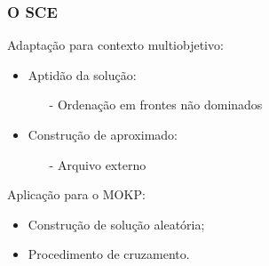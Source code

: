\documentclass[10pt,xcolor=table,fleqn]{beamer}
\begin{document}
\begin{frame}
	\frametitle{O SCE}
  \begin{block}{Adaptação para contexto multiobjetivo:}
    \begin{itemize}
      \item{ Aptidão da solução:
        \begin{itemize}
          \item[-] Ordenação em frontes não dominados
        \end{itemize}
      }
      \item{ Construção de \paretoset{} aproximado:
        \begin{itemize}
          \item[-] Arquivo externo
        \end{itemize}
      }
    \end{itemize}
  \end{block}
  \pause
  \begin{block}{Aplicação para o MOKP:}
    \begin{itemize}
      \item{ Construção de solução aleatória;}
      \item{ Procedimento de cruzamento.}
    \end{itemize}
  \end{block}
\end{frame}
\end{document}

